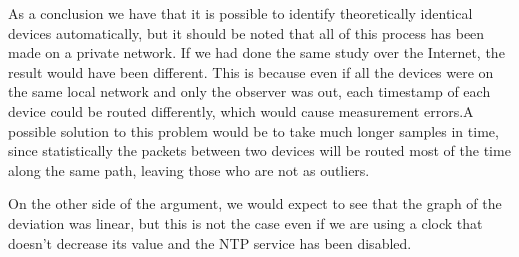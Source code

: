As a conclusion we have that it is possible to identify theoretically identical devices automatically, but it should be noted that all of this process has been made on a private network. If we had done the same study over the Internet, the result would have been different. This is because even if all the devices were on the same local network and only the observer was out, each timestamp of each device could be routed differently, which would cause measurement errors.A possible solution to this problem would be to take much longer samples in time, since statistically the packets between two devices will be routed most of the time along the same path, leaving those who are not as outliers. 

On the other side of the argument, we would expect to see that the graph of the deviation was linear, but this is not the case even if we are using a clock that doesn't decrease its value and the NTP service has been disabled.

